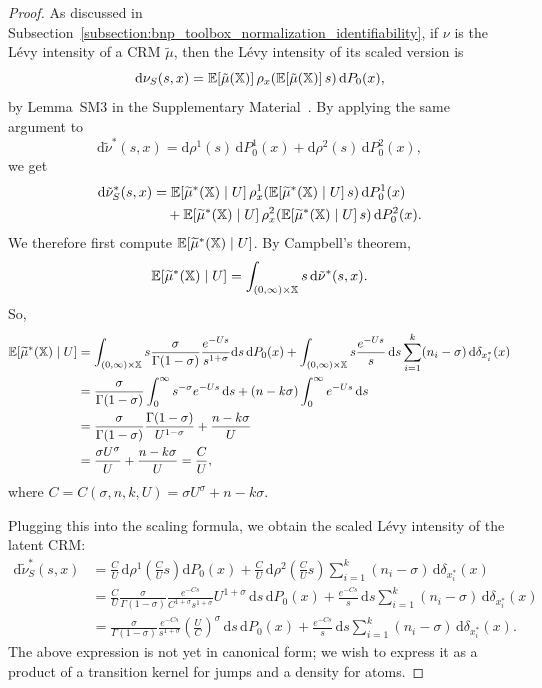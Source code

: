 \begin{proof}
As discussed in Subsection~\ref{subsection:bnp_toolbox_normalization_identifiability}, if $\nu$ is the L\'evy intensity of a CRM $\tilde{\mu}$, then the L\'evy intensity of its scaled version is
\[
\mathrm{d}\nu_S(s,x) = \mathbb{E}\!\left[\tilde{\mu}(\mathbb{X})\right] \rho_x\!\left( \mathbb{E}\!\left[\tilde{\mu}(\mathbb{X})\right]s\right)\mathrm{d}P_0(x),
\]
by Lemma~SM3 in the Supplementary Material~\cite{catalano2026merging}. By applying the same argument to 
\[
\mathrm{d}\tilde{\nu}^*(s,x) = \mathrm{d}\rho^1(s)\,\mathrm{d}P^1_0(x) + \mathrm{d}\rho^2(s)\,\mathrm{d}P^2_0(x),
\] we get
\begin{align*}
\mathrm{d}\tilde{\nu}^*_S(s,x) &= \mathbb{E}\!\left[\widetilde{\mu}^*(\mathbb{X}) \mid U\right] \rho^1_x\!\left(\mathbb{E}\!\left[\widetilde{\mu}^*(\mathbb{X}) \mid U\right]s\right)\mathrm{d}P^1_0(x) \\
&\quad + \mathbb{E}\!\left[\widetilde{\mu}^*(\mathbb{X}) \mid U\right] \rho^2_x\!\left(\mathbb{E}\!\left[\widetilde{\mu}^*(\mathbb{X}) \mid U\right]s\right)\mathrm{d}P^2_0(x).
\end{align*}
We therefore first compute $\mathbb{E}\!\left[\widetilde{\mu}^*(\mathbb{X}) \mid U\right]$. By Campbell's theorem,
\[
\mathbb{E}\!\left[\widetilde{\mu}^*(\mathbb{X}) \mid U\right] = \int_{(0,\infty)\times\mathbb{X}}s\,\mathrm{d}\tilde{\nu}^*(s,x).
\]
So,
\begin{align*}
    \mathbb{E}\!\left[\widetilde{\mu}^*(\mathbb{X}) \mid U\right] & = \int_{(0,\infty)\times\mathbb{X}}s\frac{\sigma}{\Gamma(1-\sigma)}\frac{e^{-Us}}{s^{1+\sigma}}\mathrm{d}s\,\mathrm{d}P_0(x)
    + \int_{(0,\infty)\times\mathbb{X}}s\frac{e^{-Us}}{s}\,\mathrm{d}s\sum_{i = 1}^k(n_i - \sigma)\,\mathrm{d}\delta_{x_i^*}(x) \\
    & = \frac{\sigma}{\Gamma(1-\sigma)}\int_0^\infty s^{-\sigma} e^{-Us}\,\mathrm{d}s + (n-k\sigma)\int_0^\infty e^{-Us}\,\mathrm{d}s \\
    & = \frac{\sigma}{\Gamma(1-\sigma)} \frac{\Gamma(1-\sigma)}{U^{1-\sigma}} + \frac{n - k\sigma}{U} \\
    & = \frac{\sigma U^\sigma}{U} + \frac{n - k\sigma}{U} = \frac{C}{U},
\end{align*}
where $C = C(\sigma, n, k, U) = \sigma U^\sigma + n - k\sigma$.

Plugging this into the scaling formula, we obtain the scaled L\'evy intensity of the latent CRM:
\begin{align*}
    \mathrm{d}\tilde{\nu}^*_{S}(s,x) &= \frac{C}{U}\,\mathrm{d}\rho^1\!\left(\frac{C}{U}s \right)\mathrm{d}P_0(x) +
    \frac{C}{U}\,\mathrm{d}\rho^2\!\left(\frac{C}{U}s \right)\sum_{i = 1}^k(n_i-\sigma)\,\mathrm{d}\delta_{x_i^*}(x) \\
    & = \frac{C}{U}\frac{\sigma}{\Gamma(1-\sigma)}\frac{e^{-Cs}}{C^{1+\sigma}s^{1+\sigma}}U^{1+\sigma}\,\mathrm{d}s\,\mathrm{d}P_0(x)
    + \frac{e^{-Cs}}{s}\,\mathrm{d}s \sum_{i = 1}^k(n_i-\sigma)\,\mathrm{d}\delta_{x_i^*}(x) \\
    & = \frac{\sigma}{\Gamma(1-\sigma)}\frac{e^{-Cs}}{s^{1+\sigma}}\left(\frac{U}{C} \right)^\sigma\,\mathrm{d}s\,\mathrm{d}P_0(x) 
    +\frac{e^{-Cs}}{s}\,\mathrm{d}s\sum_{i=1}^k (n_i - \sigma)\,\mathrm{d}\delta_{x_i^*}(x).
\end{align*}
The above expression is not yet in canonical form; we wish to express it as a product of a transition kernel for jumps and a density for atoms.


\end{proof}

